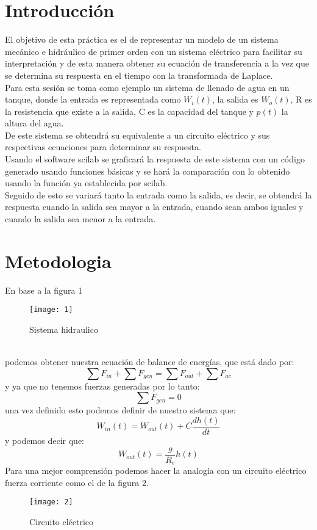 \documentclass[12pt]{article}
\begin{document}
\section{Introducción}
El objetivo de esta práctica es el de representar un modelo de un sistema mecánico e hidráulico de primer orden con un sistema eléctrico para facilitar su interpretación y de esta manera obtener su ecuación de transferencia a la vez que se determina su respuesta en el tiempo con la transformada de Laplace.\\
Para esta sesión se toma como ejemplo un sistema de llenado de agua en un tanque, donde la entrada es representada como $W_i(t)$, la salida es $W_o(t)$, R es la resistencia que existe a la salida, C es la capacidad del tanque y $p(t)$ la altura del agua.\\
De este sistema se obtendrá su equivalente a un circuito eléctrico y sus respectivas ecuaciones para determinar su respuesta.\\
Usando el software scilab se graficará la respuesta de este sistema con un código generado usando funciones básicas y se hará la comparación con lo obtenido usando la función ya establecida por scilab.\\
Seguido de esto se variará tanto la entrada como la salida, es decir, se obtendrá la respuesta cuando la salida sea mayor a la entrada, cuando sean ambos iguales y cuando la salida sea menor a la entrada.\\

	\section{Metodologia}
	En base a la figura 1
	\\ 
		\begin{figure}[h]
			\centering
			\texttt{[image: 1]}
			\caption{Sistema hidraulico}\label{figura 1}
    	\end{figure}
    \\
    podemos obtener nuestra ecuación de balance de energías, que está dado por:
	\[\sum F_{in} + \sum F_{gen}=\sum F_{out} + \sum F_{ac} \]
	y ya que no tenemos fuerzas generadas por lo tanto:
	\[\sum F_{gen}=0\]
	una vez definido esto podemos definir de nuestro sistema que:
	\[W_{in}(t)=W_{out}(t)+C\frac{dh(t)}{dt}\]
	y podemos decir que:
	\[W_{out}(t)=\frac{g}{R_e}h(t)\]
	Para una mejor comprensión podemos hacer la analogía con un circuito eléctrico fuerza corriente como el de la figura 2.
	
	\begin{figure}[H]
		\centering
		\texttt{[image: 2]}
		\caption{Circuito eléctrico}\label{figura 2}
	\end{figure}
	
\end{document}
